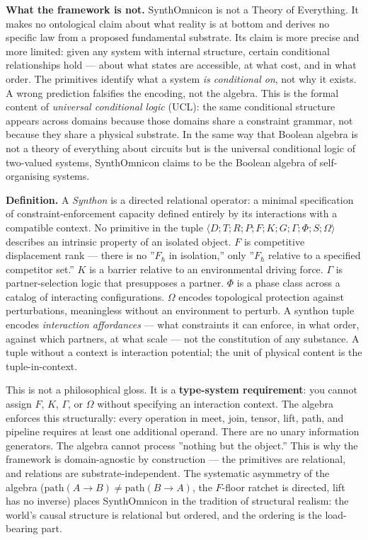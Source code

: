 \documentclass[12pt,a4paper]{article}
\begin{document}
\textbf{What the framework is not.} SynthOmnicon is not a Theory of Everything. It makes no ontological claim about what reality is at bottom and derives no specific law from a proposed fundamental substrate. Its claim is more precise and more limited: given any system with internal structure, certain conditional relationships hold --- about what states are accessible, at what cost, and in what order. The primitives identify what a system \emph{is conditional on}, not why it exists. A wrong prediction falsifies the encoding, not the algebra. This is the formal content of \emph{universal conditional logic} (UCL): the same conditional structure appears across domains because those domains share a constraint grammar, not because they share a physical substrate. In the same way that Boolean algebra is not a theory of everything about circuits but is the universal conditional logic of two-valued systems, SynthOmnicon claims to be the Boolean algebra of self-organising systems.

\textbf{Definition.} A \emph{Synthon} is a directed relational operator: a minimal specification of constraint-enforcement capacity defined entirely by its interactions with a compatible context. No primitive in the tuple $\langle D; T; R; P; F; K; G; \Gamma; \Phi; S; \Omega \rangle$ describes an intrinsic property of an isolated object. $F$ is competitive displacement rank --- there is no ''$F_\hbar$ in isolation,'' only ''$F_\hbar$ relative to a specified competitor set.'' $K$ is a barrier relative to an environmental driving force. $\Gamma$ is partner-selection logic that presupposes a partner. $\Phi$ is a phase class across a catalog of interacting configurations. $\Omega$ encodes topological protection against perturbations, meaningless without an environment to perturb. A synthon tuple encodes \emph{interaction affordances} --- what constraints it can enforce, in what order, against which partners, at what scale --- not the constitution of any substance. A tuple without a context is interaction potential; the unit of physical content is the tuple-in-context.

This is not a philosophical gloss. It is a \textbf{type-system requirement}: you cannot assign $F$, $K$, $\Gamma$, or $\Omega$ without specifying an interaction context. The algebra enforces this structurally: every operation in meet, join, tensor, lift, path, and pipeline requires at least one additional operand. There are no unary information generators. The algebra cannot process ''nothing but the object.'' This is why the framework is domain-agnostic by construction --- the primitives are relational, and relations are substrate-independent. The systematic asymmetry of the algebra ($\text{path}(A \to B) \neq \text{path}(B \to A)$, the $F$-floor ratchet is directed, lift has no inverse) places SynthOmnicon in the tradition of structural realism: the world's causal structure is relational but ordered, and the ordering is the load-bearing part.
\end{document}
